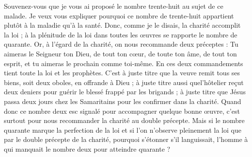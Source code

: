 Souvenez-vous que je vous ai proposé le nombre trente-huit au sujet de ce malade. Je veux vous expliquer pourquoi ce nombre de trente-huit appartient plutôt à la maladie qu’à la santé. Donc, comme je le disais, la charité accomplit la loi ; à la plénitude de la loi dans toutes les œuvres se rapporte le nombre de quarante. Or, à l’égard de la charité, on nous recommande deux préceptes : Tu aimeras le Seigneur ton Dieu, de tout ton cœur, de toute ton âme, de tout ton esprit, et tu aimeras le prochain comme toi-même. En ces deux commandements tient toute la loi et les prophètes. C’est à juste titre que la veuve remit tous ses biens, soit deux oboles, en offrande à Dieu ; à juste titre aussi quel’hôtelier reçut deux deniers pour guérir le blessé frappé par les brigands ; à juste titre que Jésus passa deux jours chez les Samaritains pour les confirmer dans la charité. Quand donc ce nombre deux esc signalé pour accompagner quelque bonne œuvre, c’est surtout pour nous recommander la charité au double précepte. Mais si le nombre quarante marque la perfection de la loi et si l’on n’observe pleinement la loi que par le double précepte de la charité, pourquoi s’étonner s’il languissait, l’homme à qui manquait le nombre deux pour atteindre quarante ?
